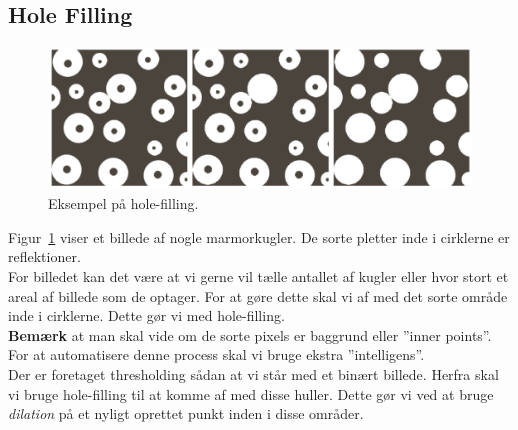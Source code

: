 \subsection{Hole Filling}

\begin{figure}[H]
	\centering
	\includegraphics[width=\linewidth]{figs/spm10/hole-filling}
	\caption{Eksempel på hole-filling.}
	\label{fig:hole-filling}
\end{figure}

Figur~\ref{fig:hole-filling} viser et billede af nogle marmorkugler. De sorte pletter inde i cirklerne er reflektioner.\\

For billedet kan det være at vi gerne vil tælle antallet af kugler eller hvor stort et areal af billede som de optager. For at gøre dette skal vi af med det sorte område inde i cirklerne. Dette gør vi med hole-filling.\\

\textbf{Bemærk} at man skal vide om de sorte pixels er baggrund eller ''inner points''. For at automatisere denne process skal vi bruge ekstra ''intelligens''.\\

Der er foretaget thresholding sådan at vi står med et binært billede. Herfra skal vi bruge hole-filling til at komme af med disse huller. Dette gør vi ved at bruge \textit{dilation} på et nyligt oprettet punkt inden i disse områder.
